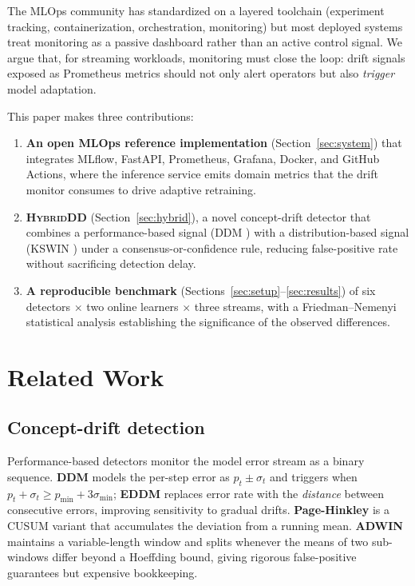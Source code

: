 \documentclass[conference]{IEEEtran}
\begin{document}
The MLOps community has standardized on a layered toolchain
(experiment tracking, containerization, orchestration, monitoring) but most
deployed systems treat monitoring as a passive dashboard rather than an active
control signal. We argue that, for streaming workloads, monitoring must close
the loop: drift signals exposed as Prometheus metrics should not only alert
operators but also \emph{trigger} model adaptation.

This paper makes three contributions:
\begin{enumerate}
\item \textbf{An open MLOps reference implementation} (Section~\ref{sec:system})
that integrates MLflow, FastAPI, Prometheus, Grafana, Docker, and GitHub
Actions, where the inference service emits domain metrics that the drift
monitor consumes to drive adaptive retraining.
\item \textbf{\textsc{HybridDD}} (Section~\ref{sec:hybrid}), a novel
concept-drift detector that combines a performance-based signal (DDM
\cite{gama2004ddm}) with a distribution-based signal (KSWIN
\cite{raab2020kswin}) under a consensus-or-confidence rule, reducing
false-positive rate without sacrificing detection delay.
\item \textbf{A reproducible benchmark} (Sections~\ref{sec:setup}--\ref{sec:results})
of six detectors $\times$ two online learners $\times$ three streams, with a
Friedman--Nemenyi statistical analysis \cite{demsar2006stat} establishing the
significance of the observed differences.
\end{enumerate}

\section{Related Work}
\label{sec:related}

\subsection{Concept-drift detection}

Performance-based detectors monitor the model error stream as a binary
sequence. \textbf{DDM} \cite{gama2004ddm} models the per-step error as
$p_t \pm \sigma_t$ and triggers when $p_t + \sigma_t \geq p_{\min} + 3\sigma_{\min}$;
\textbf{EDDM} \cite{baena2006eddm} replaces error rate with the
\emph{distance} between consecutive errors, improving sensitivity to gradual
drifts. \textbf{Page-Hinkley} \cite{page1954cusum} is a CUSUM variant that
accumulates the deviation from a running mean.
\textbf{ADWIN} \cite{bifet2007adwin} maintains a variable-length window and
splits whenever the means of two sub-windows differ beyond a Hoeffding bound,
giving rigorous false-positive guarantees but expensive bookkeeping.
\end{document}
